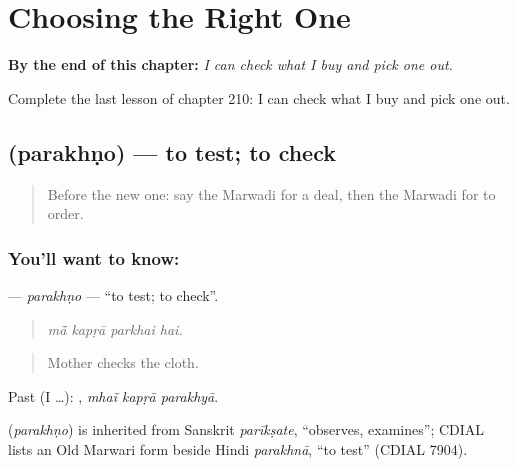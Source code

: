 
\chapter{Choosing the Right One}
\label{ch:mw-choosing-the-right-one}

\begin{chapteropening}
\textbf{By the end of this chapter:} \emph{I can check what I buy and pick one out.}

Complete the last lesson of chapter 210: I can check what I buy and pick one out.
\end{chapteropening}

\section[\texorpdfstring{\mw{परखणो} (parakhṇo)}{परखणो (parakhṇo)}]{ (parakhṇo) — to test; to check}

\label{lesson:MW-C210-parakhno}



\begin{quote}
Before the new one: say the Marwadi for a deal, then the Marwadi for to order.
\end{quote}

\subsection*{You'll want to know: }
\textbf{} — \emph{parakhṇo} — \textquotedblleft{}to test; to check\textquotedblright{}.

\begin{quote}
   
\end{quote}

\begin{quote}
\emph{mā̃ kapṛā parkhai hai.}
\end{quote}

\begin{quote}
Mother checks the cloth.
\end{quote}

Past (I …):   , \emph{mhaĩ kapṛā parakhyā}.

\begin{cousinweb}
\textbf{} (\emph{parakhṇo}) is inherited from Sanskrit \emph{parīkṣate}, \textquotedblleft{}observes, examines\textquotedblright{}; CDIAL lists an Old Marwari form beside Hindi \emph{parakhnā}, \textquotedblleft{}to test\textquotedblright{} (CDIAL 7904).
\end{cousinweb}

